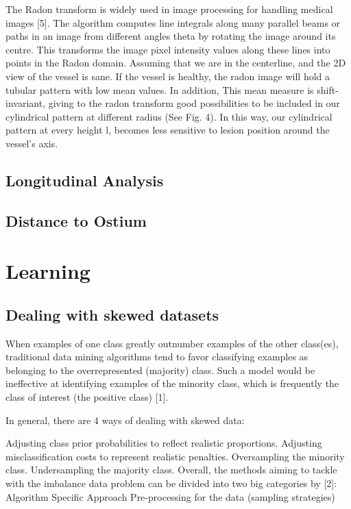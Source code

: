 The Radon transform is widely used in image processing for handling medical images [5]. The algorithm computes line integrals along many parallel beams or paths in an image from different angles theta by rotating the image around its centre. This transforms the image pixel intensity values along these lines into points in the Radon domain. Assuming that we are in the centerline, and the 2D view of the vessel is sane. If the vessel is healthy, the radon image will hold a tubular pattern with low mean values. In addition, This mean measure is shift-invariant, giving to the radon transform good possibilities to be included in our cylindrical pattern at different radius (See Fig. 4). In this way, our cylindrical pattern at every height l, becomes less sensitive to lesion position around the vessel’s axis.

\subsection{Longitudinal Analysis}

\subsection{Distance to Ostium}

\section{Learning}

\subsection{Dealing with skewed datasets}

When examples of one class greatly outnumber examples of the other class(es), traditional data mining algorithms tend to favor classifying examples as belonging to the overrepresented (majority) class. Such a model would be ineffective at identifying examples of the minority class, which is frequently the class of interest (the positive class) [1].

In general, there are 4 ways of dealing with skewed data:

Adjusting class prior probabilities to reflect realistic proportions.
Adjusting misclassification costs to represent realistic penalties.
Oversampling the minority class.
Undersampling the majority class.
Overall, the methods aiming to tackle with the imbalance data problem can be divided into two big categories by [2]:
Algorithm Specific Approach
Pre-processing for the data (sampling strategies)

